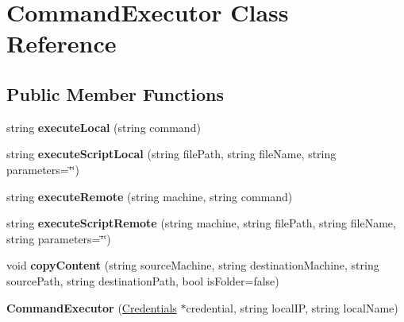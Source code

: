 \hypertarget{classCommandExecutor}{\section{\-Command\-Executor \-Class \-Reference}
\label{classCommandExecutor}
}
\subsection*{\-Public \-Member \-Functions}
\begin{DoxyCompactItemize}
\item 
\hypertarget{classCommandExecutor_a26bfde0c200ccefb8c33ea4da92e4ca6}{string {\bfseries execute\-Local} (string command)}\label{classCommandExecutor_a26bfde0c200ccefb8c33ea4da92e4ca6}

\item 
\hypertarget{classCommandExecutor_a77785fc823281946c2e95668ff285e4c}{string {\bfseries execute\-Script\-Local} (string file\-Path, string file\-Name, string parameters=\char`\"{}\char`\"{})}\label{classCommandExecutor_a77785fc823281946c2e95668ff285e4c}

\item 
\hypertarget{classCommandExecutor_a2770c11a5560e825fa35abb0d0367152}{string {\bfseries execute\-Remote} (string machine, string command)}\label{classCommandExecutor_a2770c11a5560e825fa35abb0d0367152}

\item 
\hypertarget{classCommandExecutor_a73460f67197b941d4fc61a07c9ec308b}{string {\bfseries execute\-Script\-Remote} (string machine, string file\-Path, string file\-Name, string parameters=\char`\"{}\char`\"{})}\label{classCommandExecutor_a73460f67197b941d4fc61a07c9ec308b}

\item 
\hypertarget{classCommandExecutor_a5900b0c052c604eb4d380eae83f8d604}{void {\bfseries copy\-Content} (string source\-Machine, string destination\-Machine, string source\-Path, string destination\-Path, bool is\-Folder=false)}\label{classCommandExecutor_a5900b0c052c604eb4d380eae83f8d604}

\item 
\hypertarget{classCommandExecutor_a779356959d1478bdc5b318dee6320336}{{\bfseries \-Command\-Executor} (\hyperlink{classCredentials}{\-Credentials} $\ast$credential, string local\-I\-P, string local\-Name)}\label{classCommandExecutor_a779356959d1478bdc5b318dee6320336}

\end{DoxyCompactItemize}
